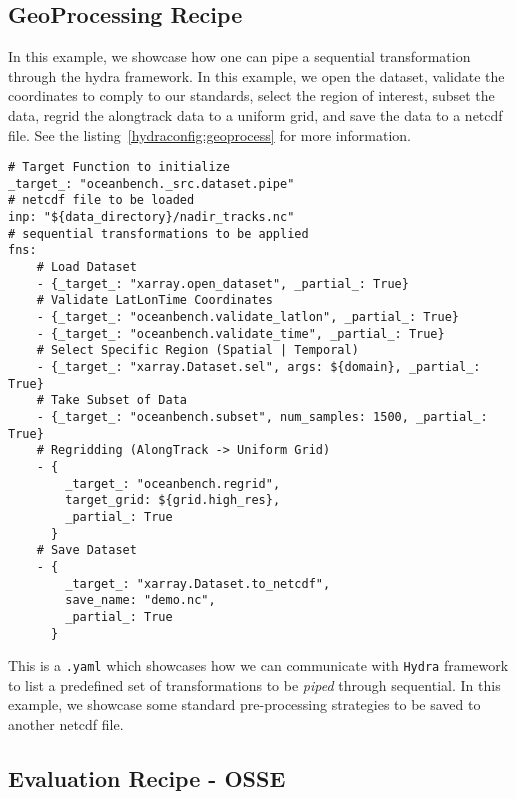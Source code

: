 \newpage
\subsection*{GeoProcessing Recipe} \label{sec:hydra_geoprocess_task}

In this example, we showcase how one can pipe a sequential transformation through the hydra framework. In this example, we open the dataset, validate the coordinates to comply to our standards, select the region of interest, subset the data, regrid the alongtrack data to a uniform grid, and save the data to a netcdf file. See the listing~\ref{hydraconfig:geoprocess} for more information.


\begin{listing}[ht!]
\begin{verbatim}
# Target Function to initialize
_target_: "oceanbench._src.dataset.pipe"
# netcdf file to be loaded
inp: "${data_directory}/nadir_tracks.nc"
# sequential transformations to be applied
fns:
    # Load Dataset
    - {_target_: "xarray.open_dataset", _partial_: True}
    # Validate LatLonTime Coordinates
    - {_target_: "oceanbench.validate_latlon", _partial_: True}
    - {_target_: "oceanbench.validate_time", _partial_: True}
    # Select Specific Region (Spatial | Temporal)
    - {_target_: "xarray.Dataset.sel", args: ${domain}, _partial_: True}
    # Take Subset of Data
    - {_target_: "oceanbench.subset", num_samples: 1500, _partial_: True}
    # Regridding (AlongTrack -> Uniform Grid)
    - {
        _target_: "oceanbench.regrid", 
        target_grid: ${grid.high_res}, 
        _partial_: True
      }
    # Save Dataset
    - {
        _target_: "xarray.Dataset.to_netcdf", 
        save_name: "demo.nc", 
        _partial_: True
      }
\end{verbatim}
\caption{This is a \texttt{.yaml} which showcases how we can communicate with \texttt{Hydra} framework to list a predefined set of transformations to be \textit{piped} through sequential. In this example, we showcase some standard pre-processing strategies to be saved to another netcdf file.}
\label{hydraconfig:geoprocess}
\end{listing}


\subsection*{Evaluation Recipe - OSSE} \label{sec:hydra_evaluation_task}

